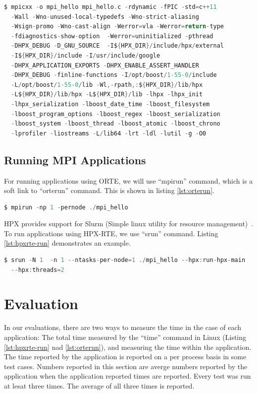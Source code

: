 \begin{lstlisting}[language=C, frame=single, basicstyle=\footnotesize, caption=Compile Line for Hello World\label{lst:compile}]
  $ mpicxx -o mpi_hello mpi_hello.c -rdynamic -fPIC -std=c++11
  -Wall -Wno-unused-local-typedefs -Wno-strict-aliasing
  -Wsign-promo -Wno-cast-align -Werror=vla -Werror=return-type
  -fdiagnostics-show-option  -Werror=uninitialized -pthread
  -DHPX_DEBUG -D_GNU_SOURCE  -I${HPX_DIR}/include/hpx/external
  -I${HPX_DIR}/include -I/usr/include/google
  -DHPX_APPLICATION_EXPORTS -DHPX_ENABLE_ASSERT_HANDLER
  -DHPX_DEBUG -finline-functions -I/opt/boost/1-55-0/include
  -L/opt/boost/1-55-0/lib -Wl,-rpath,:${HPX_DIR}/lib/hpx
  -L${HPX_DIR}/lib/hpx -L${HPX_DIR}/lib -lhpx -lhpx_init
  -lhpx_serialization -lboost_date_time -lboost_filesystem
  -lboost_program_options -lboost_regex -lboost_serialization
  -lboost_system -lboost_thread -lboost_atomic -lboost_chrono
  -lprofiler -liostreams -L/lib64 -lrt -ldl -lutil -g -O0
\end{lstlisting}

\subsection{Running MPI Applications}
For running applications using ORTE, we will use ``mpirun'' command, which is a soft link to ``orterun'' command. This is shown in listing \ref{lst:orterun}.

\begin{lstlisting}[language=C, frame=single, basicstyle=\footnotesize, caption=Running MPI Applications Using ORTE \label{lst:orterun}]
$ mpirun -np 1 -pernode ./mpi_hello
\end{lstlisting}

HPX provides support for Slurm (Simple linux utility for resource management)~\cite{yoo2003slurm}. To run applications using HPX-RTE, we use ``srun'' command. Listing \ref{lst:hpxrte-run} demonstrates an example.

\begin{lstlisting}[language=C, frame=single, basicstyle=\footnotesize, caption=Running MPI Applications Using HPX-RTE \label{lst:hpxrte-run}]
$ srun -N 1  -n 1 --ntasks-per-node=1 ./mpi_hello --hpx:run-hpx-main
  --hpx:threads=2
\end{lstlisting}


\section{Evaluation}
In our evaluations, there are two ways to measure the time in the case of each application: The total time measured by the ``time'' command in Linux (Listing \ref{lst:hpxrte-run} nad \ref{lst:orterun}), and measuring the time within the application. The time reported by the application is reported on a per process basis in some test cases. Numbers reported in this section are averge numbers reported by the application when the application reported times are reported. Every test was run at lesat three times. The average of all three times is reported.



